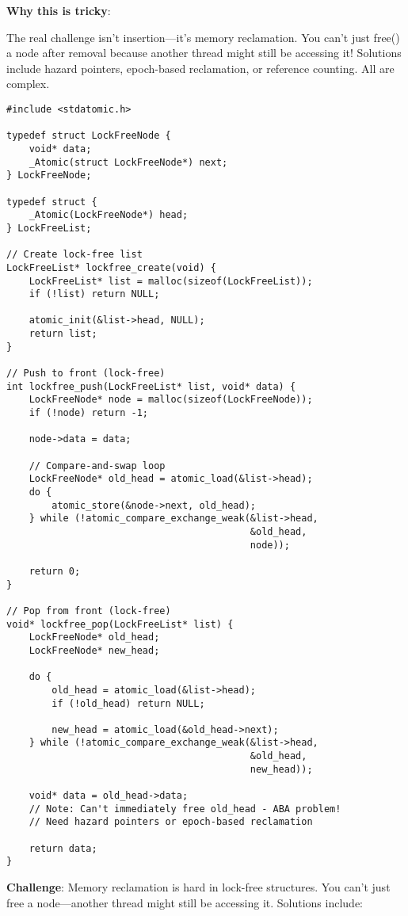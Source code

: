 \textbf{Why this is tricky}:

The real challenge isn't insertion---it's memory reclamation. You can't just free() a node after removal because another thread might still be accessing it! Solutions include hazard pointers, epoch-based reclamation, or reference counting. All are complex.

\begin{lstlisting}
#include <stdatomic.h>

typedef struct LockFreeNode {
    void* data;
    _Atomic(struct LockFreeNode*) next;
} LockFreeNode;

typedef struct {
    _Atomic(LockFreeNode*) head;
} LockFreeList;

// Create lock-free list
LockFreeList* lockfree_create(void) {
    LockFreeList* list = malloc(sizeof(LockFreeList));
    if (!list) return NULL;

    atomic_init(&list->head, NULL);
    return list;
}

// Push to front (lock-free)
int lockfree_push(LockFreeList* list, void* data) {
    LockFreeNode* node = malloc(sizeof(LockFreeNode));
    if (!node) return -1;

    node->data = data;

    // Compare-and-swap loop
    LockFreeNode* old_head = atomic_load(&list->head);
    do {
        atomic_store(&node->next, old_head);
    } while (!atomic_compare_exchange_weak(&list->head,
                                           &old_head,
                                           node));

    return 0;
}

// Pop from front (lock-free)
void* lockfree_pop(LockFreeList* list) {
    LockFreeNode* old_head;
    LockFreeNode* new_head;

    do {
        old_head = atomic_load(&list->head);
        if (!old_head) return NULL;

        new_head = atomic_load(&old_head->next);
    } while (!atomic_compare_exchange_weak(&list->head,
                                           &old_head,
                                           new_head));

    void* data = old_head->data;
    // Note: Can't immediately free old_head - ABA problem!
    // Need hazard pointers or epoch-based reclamation

    return data;
}
\end{lstlisting}

\textbf{Challenge}: Memory reclamation is hard in lock-free structures. You can't just free a node---another thread might still be accessing it. Solutions include:

